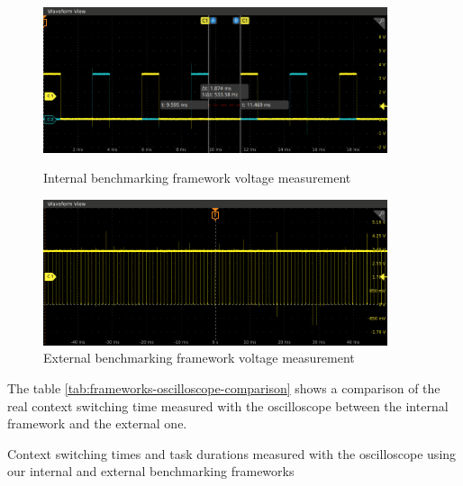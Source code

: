 \begin{figure}[!ht]
  \centering

  \begin{minipage}{0.45\textwidth}
    \includegraphics[width=0.9\textwidth]{assets/framework-value-wave.png}
    \caption{\label{fig:internal-framework-value-wave}Internal benchmarking framework voltage measurement}

  \end{minipage}\hfill
  \begin{minipage}{0.45\textwidth}

    \includegraphics[width=0.9\textwidth]{assets/external-framework-value-wave.png}
    \caption{\label{fig:external-framework-value-wave}External benchmarking framework voltage measurement}

  \end{minipage}
\end{figure}

The table \ref{tab:frameworks-oscilloscope-comparison} shows a comparison of the real context switching time measured with the oscilloscope between the internal framework and the external one.

\begin{table}[!ht]
  \centering
  
  \caption{Context switching times and task durations measured with the oscilloscope using our internal and external benchmarking frameworks}
  \label{tab:frameworks-oscilloscope-comparison}
\end{table}

